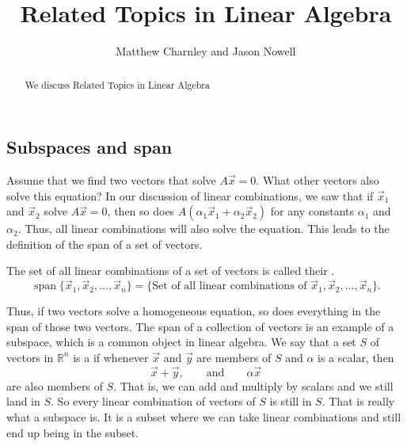 \documentclass{ximera}
\title{Related Topics in Linear Algebra}
\author{Matthew Charnley and Jason Nowell}
\begin{document}
\begin{abstract}
    We discuss Related Topics in Linear Algebra
\end{abstract}
\maketitle

\label{sec:kernel}


\subsection{Subspaces and span}
Assume that we find two vectors that solve $A\vec{x} = 0$. What other vectors also solve this equation? In our discussion of linear combinations, we saw that if $\vec{x}_1$ and $\vec{x}_2$ solve $A\vec{x} = 0$, then so does $A(\alpha_1\vec{x}_1 + \alpha_2\vec{x}_2)$ for any constants $\alpha_1$ and $\alpha_2$. Thus, all linear combinations will also solve the equation. This leads to the definition of the span of a set of vectors.

\begin{definition}
    The set of all linear combinations of a set of vectors is called their \emph{}.
    \begin{equation*}
        \operatorname{span} \bigl\{ \vec{x}_1, \vec{x}_2 , \ldots , \vec{x}_n \bigr\} =
        \bigl\{ \text{Set of all linear combinations of $\vec{x}_1, \vec{x}_2 , \ldots , \vec{x}_n$} \bigr\} .
    \end{equation*}
\end{definition}

Thus, if two vectors solve a homogeneous equation, so does everything in the span of those two vectors. The span of a collection of vectors is an example of a subspace, which is a common object in linear algebra. We say that a set $S$ of vectors in ${\mathbb R}^n$ is a \emph{} if whenever $\vec{x}$ and $\vec{y}$ are members of $S$ and $\alpha$ is a scalar, then
\begin{equation*}
    \vec{x} + \vec{y}, \qquad \text{and} \qquad \alpha \vec{x}
\end{equation*}
are also members of $S$.  That is, we can add and multiply by scalars and we still land in $S$.  So every linear combination of vectors of $S$ is still in $S$.  That is really what a subspace is.  It is a subset where we can take linear combinations and still end up being in the subset.
\end{document}
